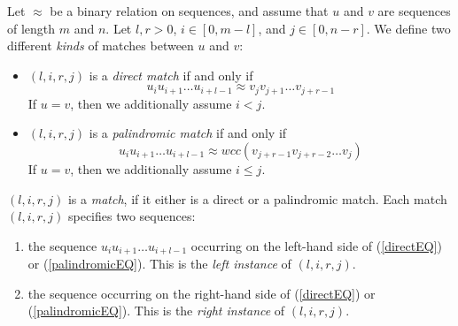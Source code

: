 \documentclass[12pt,titlepage]{article}
\newcommand{\Iff}{if and only if\xspace}
\begin{document}
\begin{AboutVmatch}
Let \(\approx\) be a binary relation on sequences, and assume that
\(u\) and \(v\) are sequences of length \(m\) and \(n\). 
Let \(l,r>0\), \(i\in[0,m-l]\), and \(j\in[0,n-r]\). We define two different
\emph{kinds} of matches between \(u\) and \(v\):
\begin{itemize}
\item
\((l,i,r,j)\) is a 
\emph{direct match} \Iff
\begin{equation}
u_{i}u_{i+1}\ldots u_{i+l-1}\approx v_{j}v_{j+1}\ldots v_{j+r-1}
\label{directEQ}
\end{equation}
If \(u=v\), then we additionally assume \(i<j\).
\item
\((l,i,r,j)\) is a 
\emph{palindromic match} \Iff
\begin{equation}
u_{i}u_{i+1}\ldots u_{i+l-1}\approx wcc(v_{j+r-1}v_{j+r-2}\ldots v_{j})
\label{palindromicEQ}
\end{equation}
If \(u=v\), then we additionally assume \(i\leq j\).
\end{itemize}
\((l,i,r,j)\) is a \emph{match}, if it either is a direct or a palindromic 
match. Each match \((l,i,r,j)\) specifies two sequences: 
\begin{enumerate}
\item
the sequence \(u_{i}u_{i+1}\ldots u_{i+l-1}\) occurring on the left-hand 
side of (\ref{directEQ}) or (\ref{palindromicEQ}). This is the 
\emph{left instance} of \((l,i,r,j)\).
\item
the sequence occurring on the right-hand 
side of (\ref{directEQ}) or (\ref{palindromicEQ}). This is 
the \emph{right instance} of \((l,i,r,j)\).
\end{enumerate}


\end{AboutVmatch}
\end{document}
